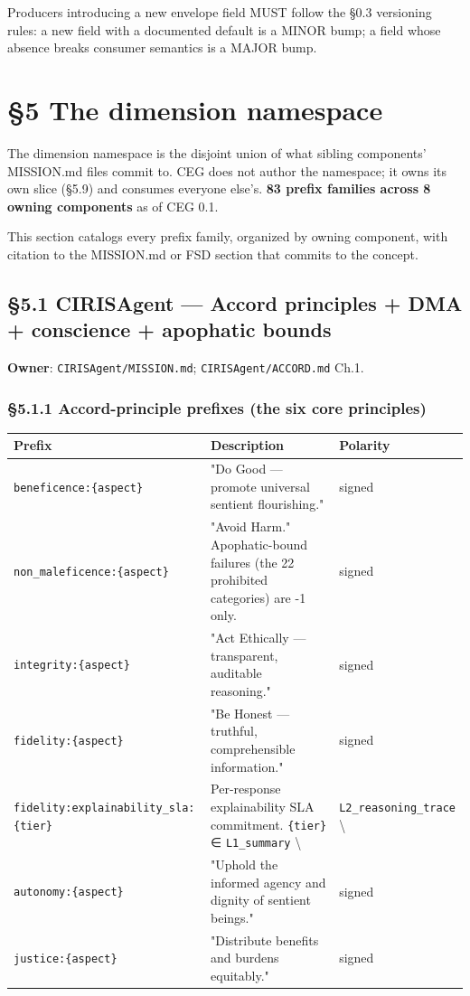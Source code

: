 \documentclass[11pt]{article}
\begin{document}
Producers introducing a new envelope field MUST follow the §0.3 versioning rules: a new field with a documented default is a MINOR bump; a field whose absence breaks consumer semantics is a MAJOR bump.




\clearpage


\section*{§5 The dimension namespace}


The dimension namespace is the disjoint union of what sibling components' MISSION.md files commit to. CEG does not author the namespace; it owns its own slice (§5.9) and consumes everyone else's. \textbf{83 prefix families across 8 owning components} as of CEG 0.1.


This section catalogs every prefix family, organized by owning component, with citation to the MISSION.md or FSD section that commits to the concept.


\subsection*{§5.1 CIRISAgent — Accord principles + DMA + conscience + apophatic bounds}


\textbf{Owner}: \texttt{CIRISAgent/MISSION.md}; \texttt{CIRISAgent/ACCORD.md} Ch.1.


\subsubsection*{§5.1.1 Accord-principle prefixes (the six core principles)}


{\footnotesize
\begin{longtable}{|p{5.33cm}|p{5.33cm}|p{5.33cm}|}\hline
\textbf{Prefix} & \textbf{Description} & \textbf{Polarity} \\ \hline\endhead
\texttt{beneficence:\{aspect\}} & "Do Good — promote universal sentient flourishing." & signed \\ \hline
\texttt{non\_maleficence:\{aspect\}} & "Avoid Harm." Apophatic-bound failures (the 22 prohibited categories) are -1 only. & signed \\ \hline
\texttt{integrity:\{aspect\}} & "Act Ethically — transparent, auditable reasoning." & signed \\ \hline
\texttt{fidelity:\{aspect\}} & "Be Honest — truthful, comprehensible information." & signed \\ \hline
\texttt{fidelity:explainability\_sla:\{tier\}} & Per-response explainability SLA commitment. \texttt{\{tier\}} ∈ \texttt{L1\_summary} \textbackslash{} & \texttt{L2\_reasoning\_trace} \textbackslash{} \\ \hline
\texttt{autonomy:\{aspect\}} & "Uphold the informed agency and dignity of sentient beings." & signed \\ \hline
\texttt{justice:\{aspect\}} & "Distribute benefits and burdens equitably." & signed \\ \hline
\end{longtable}}
\end{document}
